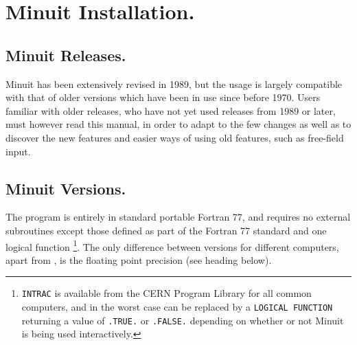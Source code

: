  
\chapter{Minuit Installation.}

\section{Minuit Releases.}
 
Minuit has been extensively revised in 1989, but the usage is
largely compatible
with that of older versions which have been in use since before 1970.
Users familiar with older releases, who have not yet used releases
from 1989 or later, must however read this manual, in order to
adapt to the few changes as well as to discover the new features
and easier ways of using old features, such as free-field input.

\section{Minuit Versions.}

The program is entirely in standard portable Fortran 77, and requires
no external subroutines except those defined as part of the Fortran 77
standard and one logical function 
\footnote{\texttt{INTRAC} is available from the CERN Program Library
  for all common computers, and in the worst case can be replaced by a
  \texttt{LOGICAL FUNCTION} returning a value of \texttt{.TRUE.} or
  \texttt{.FALSE.} depending on whether or not Minuit is being used
  interactively.}.  The only difference between versions for different
computers, apart from , is the floating point precision
(see heading below).
 
